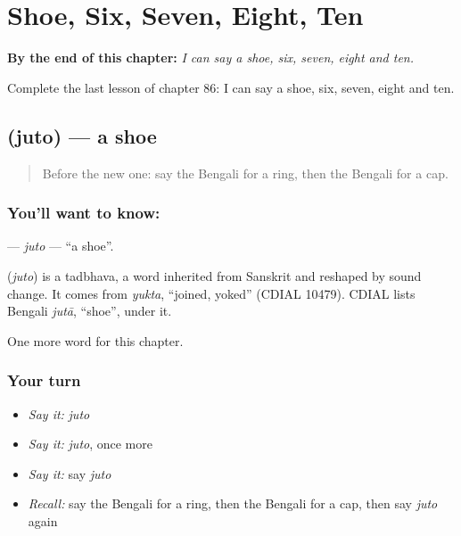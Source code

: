
\chapter{Shoe, Six, Seven, Eight, Ten}
\label{ch:bn-shoe-six-seven-eight-ten}

\begin{chapteropening}
\textbf{By the end of this chapter:} \emph{I can say a shoe, six, seven, eight and ten.}

Complete the last lesson of chapter 86: I can say a shoe, six, seven, eight and ten.
\end{chapteropening}

\section[\texorpdfstring{\bn{জুতো} (juto)}{জুতো (juto)}]{ (juto) — a shoe}

\label{lesson:BN-C86-juto}



\begin{quote}
Before the new one: say the Bengali for a ring, then the Bengali for a cap.
\end{quote}

\subsection*{You'll want to know: }
\textbf{} — \emph{juto} — \textquotedblleft{}a shoe\textquotedblright{}.

\begin{cousinweb}
\textbf{} (\emph{juto}) is a tadbhava, a word inherited from Sanskrit and reshaped by sound change. It comes from \emph{yukta}, \textquotedblleft{}joined, yoked\textquotedblright{} (CDIAL 10479). CDIAL lists Bengali \emph{jutā}, \textquotedblleft{}shoe\textquotedblright{}, under it.
\end{cousinweb}

\begin{grammarlens}[title={What you've built}]
One more word for this chapter.
\end{grammarlens}

\subsection*{Your turn}
\begin{itemize}
\raggedright
  \item \emph{Say it:} \emph{juto}
  \item \emph{Say it:} \emph{juto}, once more
  \item \emph{Say it:} say \emph{juto}
  \item \emph{Recall:} say the Bengali for a ring, then the Bengali for a cap, then say \emph{juto} again
\end{itemize}

